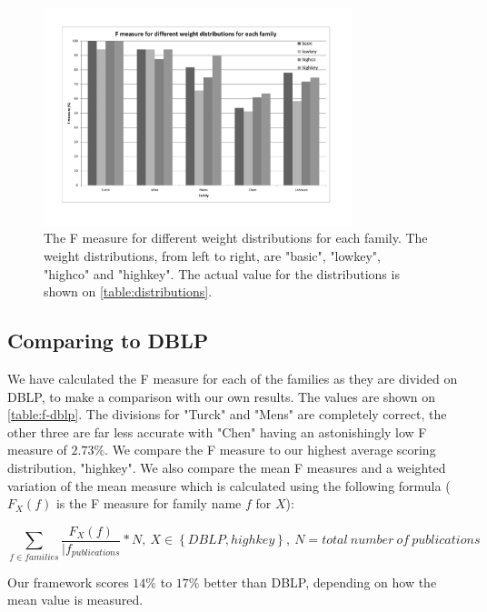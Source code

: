 \begin{figure}[htb]
	\centering
		\includegraphics[width=0.80\textwidth]{./fig/test-weights.pdf}
	\caption{The F measure for different weight distributions for each family. The weight distributions, from left to right, are "basic", "lowkey", "highco" and "highkey". The actual value for the distributions is shown on \autoref{table:distributions}.}
	\label{fig:test-weights}
\end{figure}

\subsection{Comparing to DBLP}

We have calculated the F measure for each of the families as they are divided on DBLP, to make a comparison with our own results. The values are shown on \autoref{table:f-dblp}. The divisions for "Turck" and "Mens" are completely correct, the other three are far less accurate with "Chen" having an astonishingly low F measure of $2.73\%$. We compare the F measure to our highest average scoring distribution, "highkey". We also compare the mean F measures and a weighted variation of the mean measure which is calculated using the following formula ($F_X(f)$ is the F measure for family name $f$ for $X$):

	\[
	\sum_{f \in families}{\frac{F_{X}(f)}{|f_{publications}} * N},~X \in \left\{DBLP,highkey\right\},~N = total~number~of~publications
\]

Our framework scores $14\%$ to $17\%$ better than DBLP, depending on how the mean value is measured.

